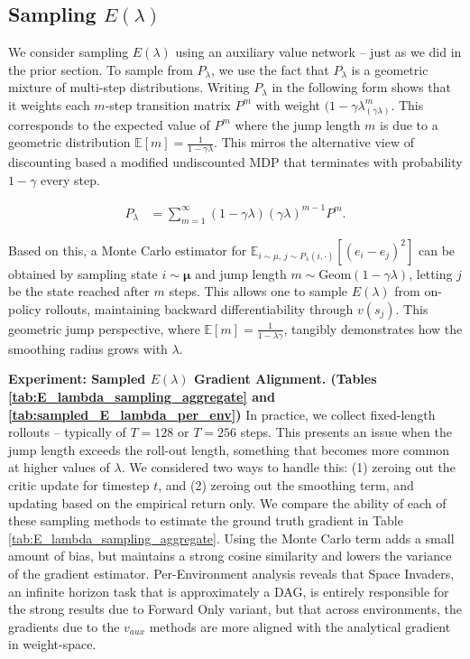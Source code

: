 \documentclass{article}
\theoremstyle{plain}
\theoremstyle{definition}
\theoremstyle{remark}
\begin{document}
\subsection{Sampling $E(\lambda)$}
We consider sampling $E(\lambda)$ using an auxiliary value network -- just as we did in the prior section. To sample from $P_\lambda$, we use the fact that $P_\lambda$ is a geometric mixture of multi-step distributions. Writing $P_\lambda$ in the following form shows that it weights each $m$-step transition matrix $P^m$ with weight $(1-\gamma\lambda_(\gamma \lambda)^m$. This corresponds to the expected value of $P^m$ where the jump length $m$ is due to a geometric distribution $\mathbb{E}[m] = \frac{1}{1-\gamma \lambda}$. This mirros the alternative view of discounting based a modified undiscounted MDP that terminates with probability $1-\gamma$ every step.

\[
\begin{aligned}
P_\lambda
&=\sum_{m=1}^{\infty}
(1-\gamma\lambda)(\gamma\lambda)^{m-1}P^m.
\end{aligned}
\]

Based on this, a Monte Carlo estimator for $\mathbb{E}_{i\sim\mu,\,j\sim P_\lambda(i,\cdot)}
\left[(e_i-e_j)^2\right]$ can be obtained by sampling state $i \sim \bm{\mu}$ and jump length $m \sim \text{Geom}(1-\gamma \lambda)$, letting $j$ be the state reached after $m$ steps. This allows one to sample $E(\lambda)$ from on-policy rollouts, maintaining backward differentiability through $v(s_j)$. This geometric jump perspective, where $\mathbb{E}[m] = \frac{1}{1-\lambda \gamma}$, tangibly demonstrates how the smoothing radius grows with $\lambda$.

\textbf{Experiment: Sampled $E(\lambda)$ Gradient Alignment. (Tables \ref{tab:E_lambda_sampling_aggregate} and \ref{tab:sampled_E_lambda_per_env})}
In practice, we collect fixed-length rollouts -- typically of $T=128$ or $T=256$ steps. This presents an issue when the jump length exceeds the roll-out length, something that becomes more common at higher values of $\lambda$. We considered two ways to handle this: (1) zeroing out the critic update for timestep $t$, and (2) zeroing out the smoothing term, and updating based on the empirical return only. We compare the ability of each of these sampling methods to estimate the ground truth gradient in Table \ref{tab:E_lambda_sampling_aggregate}. Using the Monte Carlo term adds a small amount of bias, but maintains a strong cosine similarity and lowers the variance of the gradient estimator. Per-Environment analysis reveals that Space Invaders, an infinite horizon task that is approximately a DAG, is entirely responsible for the strong results due to Forward Only variant, but that across environments, the gradients due to the $v_{aux}$ methods are more aligned with the analytical gradient in weight-space.
\end{document}
